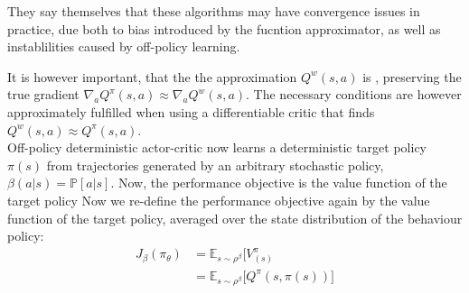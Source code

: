 They say themselves that these algorithms may have convergence issues in practice, due both to bias introduced by the fucntion approximator, as well as instablilities caused by off-policy learning.

It is however important, that the the approximation $Q^w(s,a)$ is , preserving the true gradient $\nabla_a Q^\pi(s,a) \approx \nabla_a Q^w(s,a)$. The necessary conditions are however approximately fulfilled when using a differentiable critic that finds $Q^w(s,a) \approx Q^\pi(s,a)$.\\




Off-policy deterministic actor-critic now learns a deterministic target policy $\pi(s)$ from trajectories generated by an arbitrary stochastic policy, $\beta(a|s) = \mathds{P}[a|s]$.
Now, the performance objective is the value function of the target policy %
Now we re-define the performance objective again by the value function of the target policy, averaged over the state distribution of the behaviour policy: 
\begin{align}
	J_\beta(\pi_\theta) &= \mathds{E}_{s\sim\rho^\beta} \big[ V^\pi_(s)\\
	  &= \mathds{E}_{s\sim\rho^\beta} \big[ Q^\pi(s,\pi(s)) \big]
\end{align}

